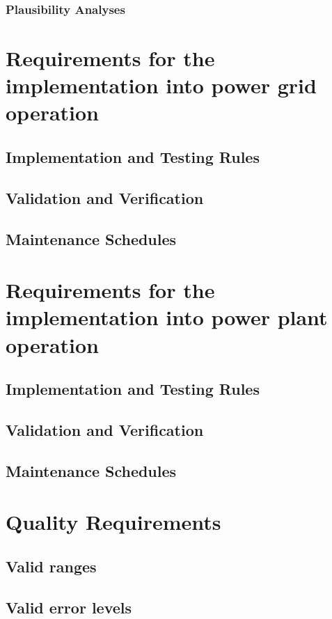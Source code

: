      \subsubsection{Plausibility Analyses}\label{sec:plausibilityanalaysis}

\section{Requirements for the implementation into power grid operation {\color{magenta}{Contributing author: COM}}}
    
    \subsection{Implementation and Testing Rules }
    
    \subsection{Validation and Verification }
    
    \subsection{Maintenance Schedules }
    
\section{Requirements for the implementation into power plant operation {\color{magenta}{Contributing author: }}}
    \subsection{Implementation and Testing Rules }
    
    \subsection{Validation and Verification }
    
    \subsection{Maintenance Schedules }

\section{Quality Requirements {\color{magenta}{Contributing author: COM}} }\label{sec:data_quality_requirements}
    
    
    \subsection{Valid ranges }\label{subsec:validranges}
    
    
    \subsection{Valid error levels }\label{subsec:validerrors}


